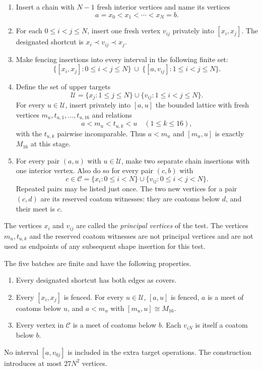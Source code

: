 \begin{enumerate}[label=\textnormal{(\arabic*)}]
\item Insert a chain with $N-1$ fresh interior vertices and name its
  vertices
  \[
    a=x_0<x_1<\cdots<x_N=b.
  \]
\item For each $0\leq i<j\leq N$, insert one fresh vertex $v_{ij}$
  privately into $[x_i,x_j]$.  The designated shortcut is
  $x_i\prec v_{ij}\prec x_j$.
\item Make fencing insertions into every interval in the following
  finite set:
  \[
    \bigl\{[x_i,x_j]:0\leq i<j\leq N\bigr\}
    \ \cup\
    \bigl\{[a,v_{ij}]:1\leq i<j\leq N\bigr\}.
  \]
\item Define the set of upper targets
  \begin{equation}
  \label{lat:targets}
    \mathcal U=
      \{x_j:1\leq j\leq N\}
      \cup\{v_{ij}:1\leq i<j\leq N\}.
  \end{equation}
  For every $u\in\mathcal U$, insert privately into $[a,u]$ the
  bounded lattice with fresh vertices $m_u,t_{u,1},\ldots,t_{u,16}$
  and relations
  \[
    a<m_u<t_{u,k}<u\quad(1\leq k\leq16),
  \]
  with the $t_{u,k}$ pairwise incomparable.  Thus $a<m_u$ and
  $[m_u,u]$ is exactly $M_{16}$ at this stage.
\item For every pair $(a,u)$ with $u\in\mathcal U$, make two separate
  chain insertions with one interior vertex.  Also do so for every
  pair $(c,b)$ with
  \begin{equation}
  \label{lat:saturated-principals}
    c\in\mathcal C=
      \{x_i:0\leq i<N\}
      \cup\{v_{ij}:0\leq i<j<N\}.
  \end{equation}
  Repeated pairs may be listed just once.  The two new vertices for
  a pair $(c,d)$ are its reserved coatom witnesses: they are coatoms
  below $d$, and their meet is $c$.
\end{enumerate}

The vertices $x_i$ and $v_{ij}$ are called the \emph{principal vertices}
of the test.  The vertices $m_u,t_{u,k}$ and the reserved coatom
witnesses are not principal vertices and are not used as endpoints of
any subsequent shape insertion for this test.

\begin{lemma}
\label{lat:shape}
The five batches are finite and have the following properties.
\begin{enumerate}[label=\textnormal{(\roman*)}]
\item Every designated shortcut has both edges as covers.
\item Every $[x_i,x_j]$ is fenced.  For every $u\in\mathcal U$,
      $[a,u]$ is fenced, $a$ is a meet of coatoms below $u$, and
      $a<m_u$ with $[m_u,u]\cong M_{16}$.
\item Every vertex in $\mathcal C$ is a meet of coatoms below $b$.
      Each $v_{iN}$ is itself a coatom below $b$.
\end{enumerate}
No interval $[a,v_{0j}]$ is included in the extra target operations.
The construction introduces at most $27N^2$ vertices.
\end{lemma}

